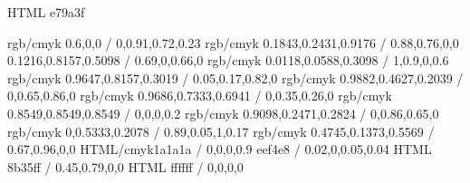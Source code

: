 


\graphicspath{ {./graphics/pictures/} } %




\geometry{a4paper,tmargin=20mm,rmargin=25mm,lmargin=25mm,margin=21mm,bmargin=20mm,footskip=5mm}

\selectcolormodel{\targetcolourmodel}

\definecolor{honey}  {HTML}     {e79a3f}

\definecolor{dtured}     {rgb/cmyk} {0.6,0,0 / 0,0.91,0.72,0.23}
\definecolor{blue}       {rgb/cmyk} {0.1843,0.2431,0.9176 / 0.88,0.76,0,0}
\definecolor{brightgreen}{rgb/cmyk} {0.1216,0.8157,0.5098 / 0.69,0,0.66,0}
\definecolor{navyblue}   {rgb/cmyk} {0.0118,0.0588,0.3098 / 1,0.9,0,0.6}
\definecolor{yellow}     {rgb/cmyk} {0.9647,0.8157,0.3019 / 0.05,0.17,0.82,0}
\definecolor{orange}     {rgb/cmyk} {0.9882,0.4627,0.2039 / 0,0.65,0.86,0}
\definecolor{pink}       {rgb/cmyk} {0.9686,0.7333,0.6941 / 0,0.35,0.26,0}
\definecolor{grey}       {rgb/cmyk} {0.8549,0.8549,0.8549 / 0,0,0,0.2}
\definecolor{red}        {rgb/cmyk} {0.9098,0.2471,0.2824 / 0,0.86,0.65,0}
\definecolor{green}      {rgb/cmyk} {0,0.5333,0.2078 / 0.89,0.05,1,0.17}
\definecolor{purple}     {rgb/cmyk} {0.4745,0.1373,0.5569 / 0.67,0.96,0,0}
\definecolor{TECblack}   {HTML/cmyk}{1a1a1a / 0,0,0,0.9}
\definecolor{TECoffwhite}{HTML}     {eef4e8 / 0.02,0,0.05,0.04}
\definecolor{TECviolet}  {HTML}     {8b35ff / 0.45,0.79,0,0}
\definecolor{TECwhite}   {HTML}     {ffffff / 0,0,0,0}

